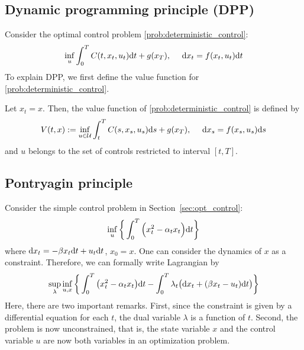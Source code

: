 \documentclass[11pt]{book}
\newcommand{\dt}{\text{\normalfont d}t}
\newcommand{\ds}{\text{\normalfont d}s}
\newcommand{\dx}{\text{\normalfont d}x}
\begin{document}
\subsection{Dynamic programming principle (DPP)}
\label{sec:dpp_deter}
Consider the optimal control problem \eqref{prob:deterministic_control}:
\begin{equation}
    \inf_u\int_0^TC(t,x_t,u_t){{\dt}}+g(x_T),~~~~{\dx}_t=f(x_t,u_t){{\dt}}
\end{equation}
To explain DPP, we first define the value function for \eqref{prob:deterministic_control}.
\begin{defn}
Let $x_t=x$. Then, the value function of \eqref{prob:deterministic_control} is defined by
    \begin{equation}
    V(t,x):=\inf_{u\in\mathcal{U}}\int_t^TC(s,x_s,u_s){{\ds}}+g(x_T),~~~~{\dx}_s=f(x_s,u_s){{\ds}}
\end{equation}
and $u$ belongs to the set of controls restricted to interval $[t,T]$.
\end{defn}


\subsection{Pontryagin principle}
\label{sec:det_pontryagin}
Consider the simple control problem in Section~\ref{sec:opt_control}:
\begin{equation}
\inf_{u}\bigg\{\int_0^T\Big(x_t^2 - \alpha_t x_t\Big) {{\dt}}\bigg\}
\end{equation}
where ${\dx}_t = -\beta x_t {{\dt}} + u_t {{\dt}}$, $x_0=x$.
One can consider the dynamics of $x$ as a constraint. Therefore, we can formally write Lagrangian by 
\begin{equation}\label{ex:sup_inf}
    \sup_{\lambda}\inf_{u,x}\bigg\{\int_0^T\big(x_t^2 - \alpha_t x_t\big) {{\dt}} - \int_0^T \lambda_t \big({\dx}_t + (\beta x_t  - u_t ){{\dt}}\big)\bigg\}
\end{equation}
Here, there are two important remarks. First,
 since the constraint is given by a differential equation for each $t$, the dual variable $\lambda$ is a function of $t$. Second, the problem is now unconstrained, that is, the state variable $x$ and the control variable $u$ are now both  variables in an optimization problem.
 
\end{document}
